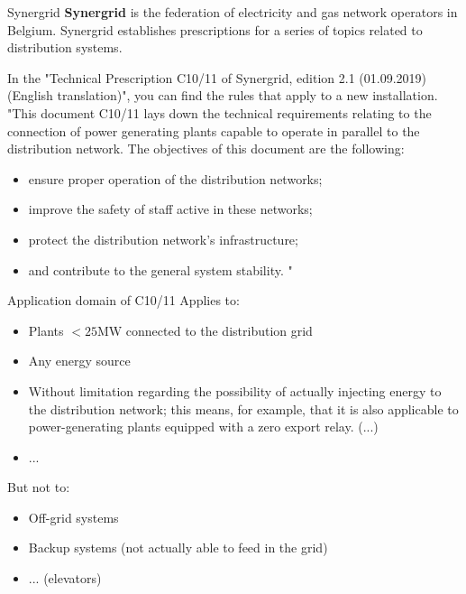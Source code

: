 \begin{frame}[allowframebreaks]{Synergrid}
\textbf{Synergrid} is the federation of electricity and gas network operators in Belgium. 
Synergrid establishes prescriptions for a series of topics related to distribution systems.

In the "Technical Prescription C10/11 of Synergrid, edition 2.1 (01.09.2019) (English translation)", you can find the rules that apply to a new installation.\\
\vspace{1cm}
"This document C10/11 lays down the technical requirements relating to the connection of power generating plants capable to operate in parallel to the distribution network.
The objectives of this document are the following:
\begin{itemize}
  \item ensure proper operation of the distribution networks;
  \item improve the safety of staff active in these networks;
  \item protect the distribution network's infrastructure;
  \item and contribute to the general system stability. "
\end{itemize}

\end{frame}\begin{frame}{Application domain of C10/11}
Applies to:

\begin{itemize}
  \item Plants $<25 \mathrm{MW}$ connected to the distribution grid
  \item Any energy source
  \item Without limitation regarding the possibility of actually injecting energy to the distribution network; this means, for example, that it is also applicable to power-generating plants equipped with a zero export relay. (...)
  \item ...
\end{itemize}

But not to:

\begin{itemize}
  \item Off-grid systems
  \item Backup systems (not actually able to feed in the grid)
  \item ... (elevators)
\end{itemize}

\end{frame}

